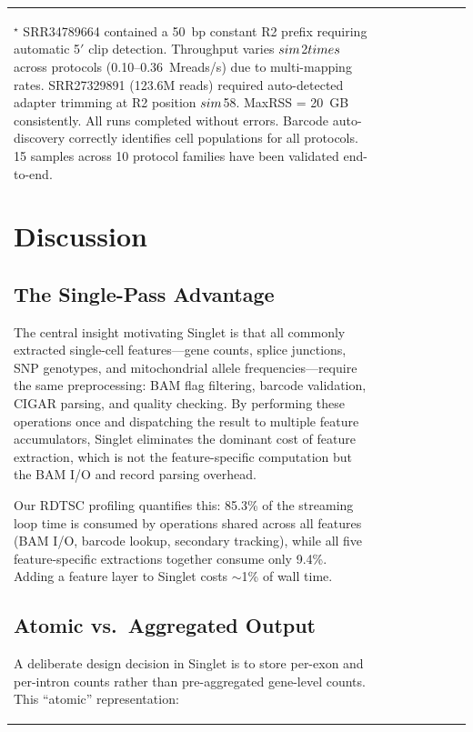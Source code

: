 \documentclass[11pt,a4paper]{article}
\begin{document}
\begin{table}[t]
\begin{tabular}{llllrrrr}
{\begin{table}[t]
\begin{flushleft}
\footnotesize
$^\star$ SRR34789664 contained a 50~bp constant R2 prefix requiring automatic 5$'$ clip detection.
Throughput varies $\\sim$2$\\times$ across protocols (0.10--0.36~Mreads/s) due to multi-mapping rates. SRR27329891 (123.6M reads) required auto-detected adapter trimming at R2 position $\\sim$58. MaxRSS = 20~GB consistently. All runs completed without errors. Barcode auto-discovery correctly identifies cell populations for all protocols. 15 samples across 10 protocol families have been validated end-to-end.
\end{flushleft}
\end{table}

\section{Discussion}

\subsection{The Single-Pass Advantage}

The central insight motivating Singlet is that all commonly extracted single-cell features---gene counts, splice junctions, SNP genotypes, and mitochondrial allele frequencies---require the same preprocessing: BAM flag filtering, barcode validation, CIGAR parsing, and quality checking. By performing these operations once and dispatching the result to multiple feature accumulators, Singlet eliminates the dominant cost of feature extraction, which is not the feature-specific computation but the BAM I/O and record parsing overhead.

Our RDTSC profiling quantifies this: 85.3\% of the streaming loop time is consumed by operations shared across all features (BAM I/O, barcode lookup, secondary tracking), while all five feature-specific extractions together consume only 9.4\%. Adding a feature layer to Singlet costs $\sim$1\% of wall time.

\subsection{Atomic vs.\ Aggregated Output}

A deliberate design decision in Singlet is to store per-exon and per-intron counts rather than pre-aggregated gene-level counts. This ``atomic'' representation:

}
\end{tabular}
\end{table}
\end{document}
